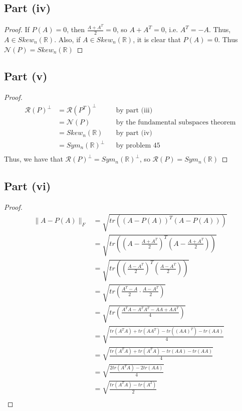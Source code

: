 \documentclass{article}
\begin{document}
\subsection*{Part (iv)}

\begin{proof}
If $P(A) = 0$, then $\frac{A + A^{T}}{2} = 0$, so $A + A^{T} = 0$, i.e. $A^{T} = -A$. Thus, $A \in Skew_{n}(\mathbb{R})$. Also, if $A \in Skew_{n}(\mathbb{R})$, it is clear that $P(A) = 0$. Thus $\mathcal{N}(P) = Skew_{n}(\mathbb{R})$
\end{proof}

\subsection*{Part (v)}

\begin{proof}
\begin{align*}
\mathcal{R}(P)^{\perp} &= \mathcal{R}(P^{T})^{\perp} &&\text{by part (iii)} \\
&= \mathcal{N}(P) &&\text{by the fundamental subspaces theorem} \\
&= Skew_{n}(\mathbb{R}) &&\text{by part (iv)} \\
&= Sym_{n}(\mathbb{R})^{\perp} &&\text{by problem 45} \\
\end{align*}
Thus, we have that $\mathcal{R}(P)^{\perp} = Sym_{n}(\mathbb{R})^{\perp}$, so $\mathcal{R}(P)= Sym_{n}(\mathbb{R})$
\end{proof}

\subsection*{Part (vi)}

\begin{proof}
\begin{align*}
\|A - P(A)\|_F &= \sqrt{tr((A - P(A))^{T}(A - P(A)))} \\
&= \sqrt{tr\left(\left(A - \frac{A + A^{T}}{2}\right)^{T}\left(A - \frac{A + A^{T}}{2}\right)\right)} \\
&= \sqrt{tr\left(\left(\frac{A - A^{T}}{2}\right)^{T}\left(\frac{A - A^{T}}{2}\right)\right)} \\
&= \sqrt{tr\left(\frac{A^{T} - A}{2} \cdot \frac{A - A^{T}}{2}\right)} \\
&= \sqrt{tr\left(\frac{A^{T}A - A^{T}A^{T} - AA + AA^{T}}{4}\right)} \\
&= \sqrt{\frac{tr(A^{T}A) + tr(AA^{T}) - tr((AA)^{T}) - tr(AA)}{4}} \\
&= \sqrt{\frac{tr(A^{T}A) + tr(A^{T}A) - tr(AA) - tr(AA)}{4}} \\
&= \sqrt{\frac{2tr(A^{T}A) - 2tr(AA)}{4}} \\
&= \sqrt{\frac{tr(A^{T}A) - tr(A^{2})}{2}} \\
\end{align*}
\end{proof}
\end{document}
